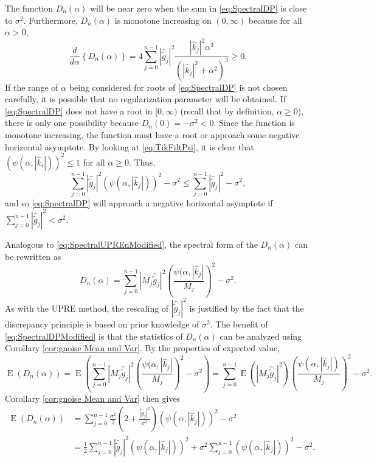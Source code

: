 \documentclass[12pt,notitlepage]{report}
\newcommand{\gnoise}{\widetilde{g}}	%
\newcommand{\regparam}{\alpha}
\newcommand{\mfilt}{\psi}
\newcommand{\noiseSD}{\sigma}	%
\DeclareMathOperator{\E}{E}	%
\newcommand{\D}{D}	%
\begin{document}
The function $\D_n(\regparam)$ will be near zero when the sum in \eqref{eq:SpectralDP} is close to $\noiseSD^2$.  Furthermore, $\D_n(\regparam)$ is monotone increasing on $(0,\infty)$ because for all $\regparam > 0$,
\[\frac{d}{d\regparam}\left\{\D_n(\regparam)\right\} = 4\sum_{j = 0}^{n-1} |\widehat{\gnoise}_j|^2\frac{|\widehat{k}_j|^2\regparam^3}{\left(|\widehat{k}_j|^2 + \regparam^2\right)^3} \geq 0.\]
If the range of $\regparam$ being considered for roots of \eqref{eq:SpectralDP} is not chosen carefully, it is possible that no regularization parameter will be obtained. If \eqref{eq:SpectralDP} does not have a root in $[0,\infty)$ (recall that by definition, $\regparam \geq 0$), there is only one possibility because $\D_n(0) = -\noiseSD^2 < 0$. Since the function is monotone increasing, the function must have a root or approach some negative horizontal asymptote. By looking at \eqref{eq:TikFiltPsi}, it is clear that $(\mfilt(\regparam,|\widehat{k}_i|))^2 \leq 1$ for all $\regparam \geq 0$. Thus,
\[\sum_{j = 0}^{n-1} |\widehat{\gnoise}_j|^2(\mfilt(\regparam,|\widehat{k}_j|))^2 - \noiseSD^2 \leq \sum_{j = 0}^{n-1} |\widehat{\gnoise}_j|^2 - \noiseSD^2,\]
and so \eqref{eq:SpectralDP} will approach a negative horizontal asymptote if $\sum_{j = 0}^{n-1} |\widehat{\gnoise}_j|^2 < \noiseSD^2$. \par
Analogous to \eqref{eq:SpectralUPREnModified}, the spectral form of the $\D_n(\regparam)$ can be rewritten as
\begin{equation}
\label{eq:SpectralDPModified}
\D_n(\regparam) = \sum_{j = 0}^{n-1} |M_j\widehat{\gnoise}_j|^2\left(\frac{\mfilt(\regparam,|\widehat{k}_j|}{M_j}\right)^2 - \noiseSD^2.
\end{equation}
As with the UPRE method, the rescaling of $|\widehat{\gnoise}_j|^2$ is justified by the fact that the discrepancy principle is based on prior knowledge of $\noiseSD^2$. The benefit of \eqref{eq:SpectralDPModified} is that the statistics of $\D_n(\regparam)$ can be analyzed using Corollary \ref{cor:gnoise Mean and Var}. By the properties of expected value,
\[\E(\D_n(\regparam)) = \E\left(\sum_{j = 0}^{n-1} |M_j\widehat{\gnoise}_j|^2\left(\frac{\mfilt(\regparam,|\widehat{k}_j|}{M_j}\right)^2 - \noiseSD^2\right) = \sum_{j = 0}^{n-1} \E\left(|M_j\widehat{\gnoise}_j|^2\right)\left(\frac{\mfilt(\regparam,|\widehat{k}_j|)}{M_j}\right)^2 - \noiseSD^2.\]
Corollary \ref{cor:gnoise Mean and Var} then gives
\begin{align*}
\E(\D_n(\regparam)) &= \sum_{j = 0}^{n-1} \frac{\noiseSD^2}{2}\left(2 + \frac{|\widehat{g}_j|^2}{\noiseSD^2}\right)(\mfilt(\regparam,|\widehat{k}_j|))^2 - \noiseSD^2 \\
&= \frac{1}{2}\sum_{j = 0}^{n-1} |\widehat{\gnoise}_j|^2(\mfilt(\regparam,|\widehat{k}_j|))^2 + \noiseSD^2\sum_{j = 0}^{n-1} (\mfilt(\regparam,|\widehat{k}_j|))^2 - \noiseSD^2.
\end{align*}
\end{document}
